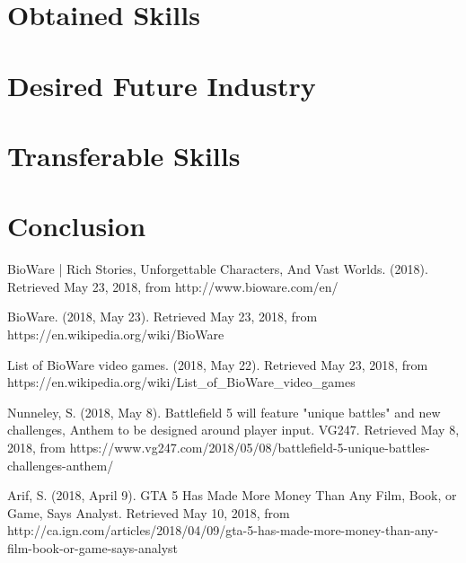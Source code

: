 \documentclass[10pt,letterpaper]{article}
\begin{document}
\section{Obtained Skills}\label{obtained-skills}

\section{Desired Future Industry}\label{desired-future-industry}

\section{Transferable Skills}\label{transferable-skills}

\section*{Conclusion}\label{conclusion}

\begin{thebibliography}{}

BioWare | Rich Stories, Unforgettable Characters, And Vast Worlds. (2018). Retrieved May 23, 2018, from http://www.bioware.com/en/ 

BioWare. (2018, May 23). Retrieved May 23, 2018, from https://en.wikipedia.org/wiki/BioWare

List of BioWare video games. (2018, May 22). Retrieved May 23, 2018, from https://en.wikipedia.org/wiki/List\_of\_BioWare\_video\_games

Nunneley, S. (2018, May 8). Battlefield 5 will feature "unique battles" and new challenges, Anthem to be designed around player input. VG247. Retrieved May 8, 2018, from https://www.vg247.com/2018/05/08/battlefield-5-unique-battles-challenges-anthem/

Arif, S. (2018, April 9). GTA 5 Has Made More Money Than Any Film, Book, or Game, Says Analyst. Retrieved May 10, 2018, from http://ca.ign.com/articles/2018/04/09/gta-5-has-made-more-money-than-any-film-book-or-game-says-analyst

\end{thebibliography}
\end{document}

